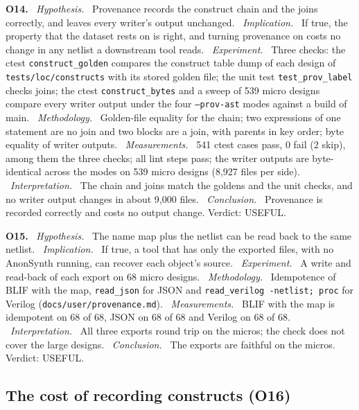 \documentclass[conference]{IEEEtran}
\newcommand{\code}[1]{\texttt{#1}}
\newcommand{\argid}[1]{\par\smallskip\noindent\textbf{#1.}}
\newcommand{\ah}[1]{\ \textit{#1.}\ }
\begin{document}
\argid{O14}
\ah{Hypothesis} Provenance records the construct chain and the joins correctly, and leaves every writer's output unchanged.
\ah{Implication} If true, the property that the dataset rests on is right, and turning provenance on costs no change in any netlist a downstream tool reads.
\ah{Experiment} Three checks: the ctest \code{construct\_golden} compares the construct table dump of each design of \code{tests/loc/constructs} with its stored golden file; the unit test \code{test\_prov\_label} checks joins; the ctest \code{construct\_bytes} and a sweep of 539 micro designs compare every writer output under the four \code{--prov-ast} modes against a build of main.
\ah{Methodology} Golden-file equality for the chain; two expressions of one statement are no join and two blocks are a join, with parents in key order; byte equality of writer outputs.
\ah{Measurements} 541 ctest cases pass, 0 fail (2 skip), among them the three checks; all lint steps pass; the writer outputs are byte-identical across the modes on 539 micro designs (8,927 files per side).
\ah{Interpretation} The chain and joins match the goldens and the unit checks, and no writer output changes in about 9,000 files.
\ah{Conclusion} Provenance is recorded correctly and costs no output change. Verdict: USEFUL.

\argid{O15}
\ah{Hypothesis} The name map plus the netlist can be read back to the same netlist.
\ah{Implication} If true, a tool that has only the exported files, with no AnonSynth running, can recover each object's source.
\ah{Experiment} A write and read-back of each export on 68 micro designs.
\ah{Methodology} Idempotence of BLIF with the map, \code{read\_json} for JSON and \code{read\_verilog -netlist; proc} for Verilog (\code{docs/user/provenance.md}).
\ah{Measurements} BLIF with the map is idempotent on 68 of 68, JSON on 68 of 68 and Verilog on 68 of 68.
\ah{Interpretation} All three exports round trip on the micros; the check does not cover the large designs.
\ah{Conclusion} The exports are faithful on the micros. Verdict: USEFUL.

\subsection{The cost of recording constructs (O16)}
\label{sec:q-cost}
\end{document}
